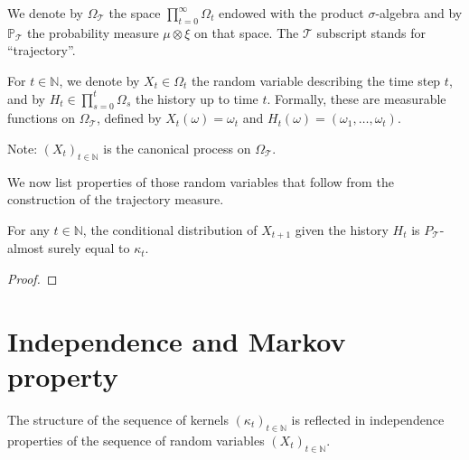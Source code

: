 We denote by $\Omega_{\mathcal{T}}$ the space $\prod_{t=0}^\infty \Omega_t$ endowed with the product $\sigma$-algebra and by $\mathbb{P}_{\mathcal{T}}$ the probability measure $\mu \otimes \xi$ on that space.
The $\mathcal{T}$ subscript stands for ``trajectory''.


\begin{definition}\label{def:history}
For $t \in \mathbb{N}$, we denote by $X_t \in \Omega_t$ the random variable describing the time step $t$, and by $H_t \in \prod_{s=0}^t \Omega_s$ the history up to time $t$.
Formally, these are measurable functions on $\Omega_{\mathcal{T}}$, defined by $X_t(\omega) = \omega_t$ and $H_t(\omega) = (\omega_1, \ldots, \omega_t)$.
\end{definition}

Note: $(X_t)_{t \in \mathbb{N}}$ is the canonical process on $\Omega_{\mathcal{T}}$.

We now list properties of those random variables that follow from the construction of the trajectory measure.

\begin{lemma}\label{lem:condDistrib_X_add_one}
For any $t \in \mathbb{N}$, the conditional distribution of $X_{t+1}$ given the history $H_t$ is $P_{\mathcal{T}}$-almost surely equal to $\kappa_t$.
\end{lemma}

\begin{proof}

\end{proof}


\section{Independence and Markov property}

The structure of the sequence of kernels $(\kappa_t)_{t \in \mathbb{N}}$ is reflected in independence properties of the sequence of random variables $(X_t)_{t \in \mathbb{N}}$.
